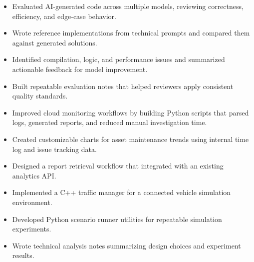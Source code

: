 \documentclass[10pt,a4paper]{altacv}
\begin{document}
\tagline{}

\begin{fullwidth}
\makecvheader
\end{fullwidth}




\begin{itemize}
\item Evaluated AI-generated code across multiple models, reviewing correctness, efficiency, and edge-case behavior.
\item Wrote reference implementations from technical prompts and compared them against generated solutions.
\item Identified compilation, logic, and performance issues and summarized actionable feedback for model improvement.
\item Built repeatable evaluation notes that helped reviewers apply consistent quality standards.
\end{itemize}


\begin{itemize}
    \item Improved cloud monitoring workflows by building Python scripts that parsed logs, generated reports, and reduced manual investigation time.
    \item Created customizable charts for asset maintenance trends using internal time log and issue tracking data.
    \item Designed a report retrieval workflow that integrated with an existing analytics API.
\end{itemize}

\medskip


\begin{itemize}
    \item Implemented a C++ traffic manager for a connected vehicle simulation environment.
    \item Developed Python scenario runner utilities for repeatable simulation experiments.
    \item Wrote technical analysis notes summarizing design choices and experiment results.
\end{itemize}
\end{document}
